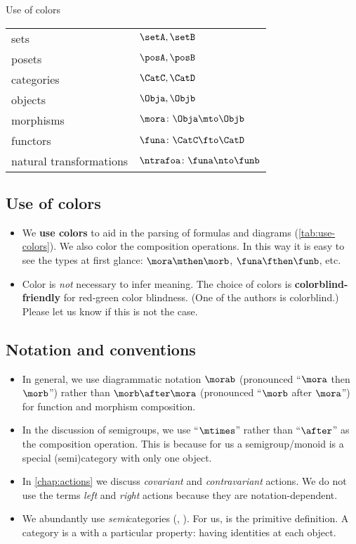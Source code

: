 \begin{margintable}
    \caption{Use of colors}
    \label{tab:use-colors}
    \begin{tabular}{p{2.5cm}l}
        sets                           & $\setA, \setB$ \\
        posets                         & $\posA, \posB$ \\
        categories                     & $\CatC, \CatD$ \\
        objects                        & $\Obja, \Objb$ \\
        morphisms                      & $\mora \colon \Obja \mto \Objb$ \\
        functors                       & $\funa \colon \CatC \fto \CatD$ \\
        natural \mbox{transformations} & $\ntrafoa \colon \funa \nto \funb$
    \end{tabular}
\end{margintable}
\subsection{Use of colors}
\begin{itemize}
    \item We \textbf{use colors} to aid in the parsing of formulas and diagrams (\cref{tab:use-colors}).
          We also color the composition operations.
          In this way it is easy to see the types at first glance:
          $\mora\mthen\morb$, $\funa\fthen\funb$, etc.
    \item Color is \emph{not} necessary to infer meaning.
          The choice of colors is \textbf{colorblind-friendly} for red-green color blindness.
          (One of the authors is colorblind.)
          Please let us know if this is not the case.
\end{itemize}

\subsection{Notation and conventions}
\begin{itemize}
    \item In general, we use diagrammatic notation $\morab$ (pronounced ``$\mora$ then $\morb$'') rather than $\morb \after \mora$ (pronounced ``$\morb$ after $\mora$'') for function and morphism composition.
    \item In the discussion of semigroups, we use ``$\mtimes$'' rather than ``$\after$'' as the  composition operation.
          This is because for us a semigroup/monoid is a special (semi)category with only one object.
    \item In \cref{chap:actions} we discuss \emph{covariant} and \emph{contravariant} actions.
          We do not use the terms \emph{left} and \emph{right} actions because they are notation-dependent.
    \item We abundantly use \emph{semi}categories (, \etc).
          For us,  is the primitive definition.
          A category is a  with a particular property: having identities at each object.
\end{itemize}

